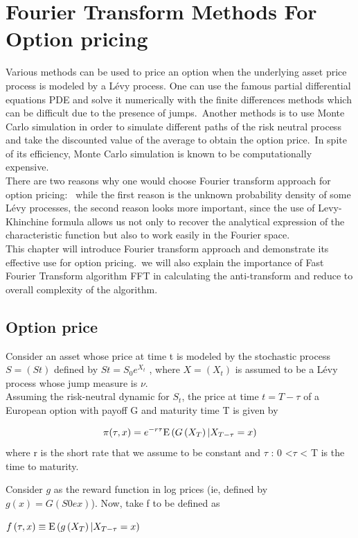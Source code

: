 \documentclass[12pt]{report}
\begin{document}
\chapter{Fourier Transform Methods For Option pricing }

Various methods can be used to price an option when the underlying
asset price process is modeled by a Lévy process. One can use the famous partial differential equations PDE and solve it numerically with the finite differences methods which  can be difficult due to the presence of jumps.~Another methods is to use Monte Carlo simulation in order to simulate different paths of the risk neutral process and take the discounted value of the average to obtain the option price.~In spite of its efficiency, Monte Carlo simulation is known to be computationally expensive.\\

There are two reasons why one would choose Fourier transform approach for option pricing:~ 
while the first reason is the unknown probability density of some Lévy processes, the second reason looks more important, since the use of Levy-Khinchine formula allows us not only to recover the analytical expression of the characteristic function but also to work easily in the Fourier space.\\

This chapter will introduce Fourier transform approach and demonstrate its effective use for option pricing.~we will also explain the importance of Fast Fourier Transform algorithm FFT in calculating the anti-transform and  reduce to overall complexity of the algorithm. 
\newpage
\section{Option price}
Consider an asset whose price at time t is modeled by the stochastic process $S = (St)$
defined by $St = S_0 e^{X_t}$ , where $X = (X_t)$  is assumed to be a Lévy process whose
jump measure is $\nu$.\\
Assuming the risk-neutral dynamic for $S_t$, the price at time $t = T-\tau$  of a European option with payoff G and maturity time T is given by


\begin{gather}
\pi(\tau,x)= e^{-r\tau} \mathrm{E} \left( {{G \left( {X_T} \right)|X_{T-\tau} = x}} \right)
\end{gather}
where r is the short rate that we assume to be constant and $\tau$ : 0 <$\tau$ < T is the time to
maturity.


Consider $g$ as the reward function in log prices (ie, defined by $g(x) = G(S0ex)$). Now, take f to be defined as
\begin{center}
$f \left( {\tau,x} \right) \equiv \mathrm{E} \left( {{g \left( {X_T} \right)|X_{T-\tau} = x}} \right)$
\end{center}
\end{document}
